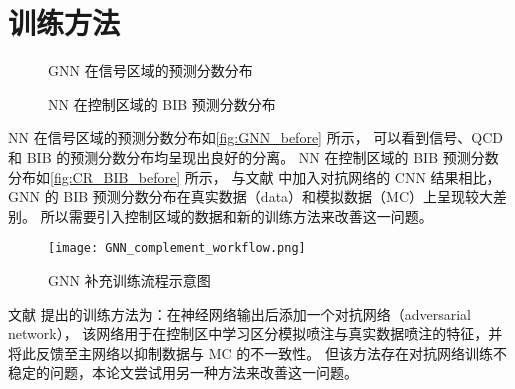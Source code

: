 \section{训练方法}
\begin{figure}[ht]
    \centering
    \hfill
    \hfill
    \caption{GNN 在信号区域的预测分数分布}
    \label{fig:GNN_before}
\end{figure}

\begin{figure}[ht]
    \centering
    \hfill
    \caption{NN 在控制区域的 BIB 预测分数分布}
    \label{fig:CR_BIB_before}
\end{figure}

NN 在信号区域的预测分数分布如\autoref{fig:GNN_before} 所示，
可以看到信号、QCD 和 BIB 的预测分数分布均呈现出良好的分离。
NN 在控制区域的 BIB 预测分数分布如\autoref{fig:CR_BIB_before} 所示，
与文献\cite{ATLAS:2022zhj} 中加入对抗网络的 CNN 结果相比，
GNN 的 BIB 预测分数分布在真实数据（data）和模拟数据（MC）上呈现较大差别。
所以需要引入控制区域的数据和新的训练方法来改善这一问题。

\begin{figure}[ht]
    \texttt{[image: GNN\_complement\_workflow.png]}
    \caption{GNN 补充训练流程示意图}
    \label{fig:GNN_complement_workflow}
\end{figure}

文献\cite{ATLAS:2022zhj} 提出的训练方法为：在神经网络输出后添加一个对抗网络（adversarial network），
该网络用于在控制区中学习区分模拟喷注与真实数据喷注的特征，并将此反馈至主网络以抑制数据与 MC 的不一致性。
但该方法存在对抗网络训练不稳定的问题，本论文尝试用另一种方法来改善这一问题。

